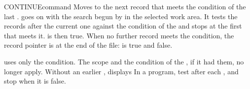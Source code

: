 \begin{XbaseEntry}{CONTINUE}{command}
Moves to the next record that meets the condition of the last .
\Syntax
{}
\Usage
{} goes on with the search begun by  in the selected
work area.  It tests the records after the current one against the
 condition of the  and stops at the first that meets it.
 is then true.  When no further record meets the condition, the
record pointer is at the end of the file:  is true and
 false.

 uses only the  condition.  The scope and the 
condition of the , if it had them, no longer apply.  Without an
earlier ,  displays
\Tips
In a program, test  after each , and stop when it is
false.
\Examples
{}
\end{XbaseEntry}

